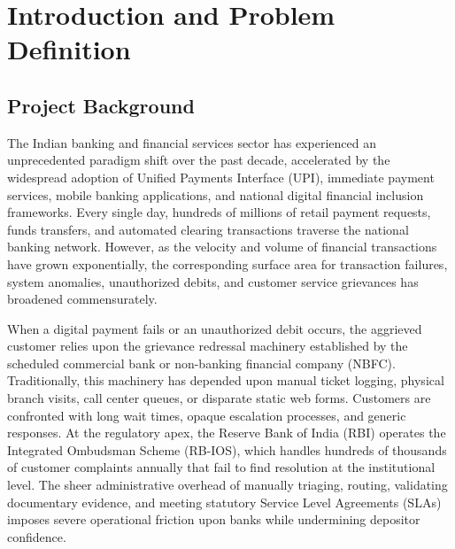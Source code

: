 \chapter{Introduction and Problem Definition}

\section{Project Background}
The Indian banking and financial services sector has experienced an unprecedented paradigm shift over the past decade, accelerated by the widespread adoption of Unified Payments Interface (UPI), immediate payment services, mobile banking applications, and national digital financial inclusion frameworks. Every single day, hundreds of millions of retail payment requests, funds transfers, and automated clearing transactions traverse the national banking network. However, as the velocity and volume of financial transactions have grown exponentially, the corresponding surface area for transaction failures, system anomalies, unauthorized debits, and customer service grievances has broadened commensurately.

When a digital payment fails or an unauthorized debit occurs, the aggrieved customer relies upon the grievance redressal machinery established by the scheduled commercial bank or non-banking financial company (NBFC). Traditionally, this machinery has depended upon manual ticket logging, physical branch visits, call center queues, or disparate static web forms. Customers are confronted with long wait times, opaque escalation processes, and generic responses. At the regulatory apex, the Reserve Bank of India (RBI) operates the Integrated Ombudsman Scheme (RB-IOS), which handles hundreds of thousands of customer complaints annually that fail to find resolution at the institutional level. The sheer administrative overhead of manually triaging, routing, validating documentary evidence, and meeting statutory Service Level Agreements (SLAs) imposes severe operational friction upon banks while undermining depositor confidence.

